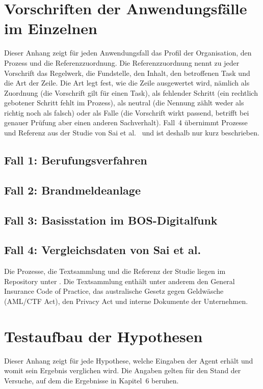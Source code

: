 \clearpage
\appendix
\section{Vorschriften der Anwendungsfälle im Einzelnen}\label{anh:vorschriften}
Dieser Anhang zeigt für jeden Anwendungsfall das Profil der Organisation, den Prozess und die Referenzzuordnung.
Die Referenzzuordnung nennt zu jeder Vorschrift das Regelwerk, die Fundstelle, den Inhalt, den betroffenen Task und die Art der Zeile.
Die Art legt fest, wie die Zeile ausgewertet wird, nämlich als Zuordnung (die Vorschrift gilt für einen Task), als fehlender Schritt (ein rechtlich gebotener Schritt fehlt im Prozess), als neutral (die Nennung zählt weder als richtig noch als falsch) oder als Falle (die Vorschrift wirkt passend, betrifft bei genauer Prüfung aber einen anderen Sachverhalt).
Fall~4 übernimmt Prozesse und Referenz aus der Studie von Sai et al.~\cite{sai2024} und ist deshalb nur kurz beschrieben.
\subsection{Fall 1: Berufungsverfahren}\label{anh:fall1}

\subsection{Fall 2: Brandmeldeanlage}\label{anh:fall2}

\subsection{Fall 3: Basisstation im BOS-Digitalfunk}\label{anh:fall3}

\subsection{Fall 4: Vergleichsdaten von Sai et al.}
Die Prozesse, die Textsammlung und die Referenz der Studie liegen im Repository unter .
Die Textsammlung enthält unter anderem den General Insurance Code of Practice, das australische Gesetz gegen Geldwäsche (AML/CTF Act), den Privacy Act und interne Dokumente der Unternehmen.

\section{Testaufbau der Hypothesen}\label{anh:testaufbau}
Dieser Anhang zeigt für jede Hypothese, welche Eingaben der Agent erhält und womit sein Ergebnis verglichen wird.
Die Angaben gelten für den Stand der Versuche, auf dem die Ergebnisse in Kapitel~6 beruhen.

